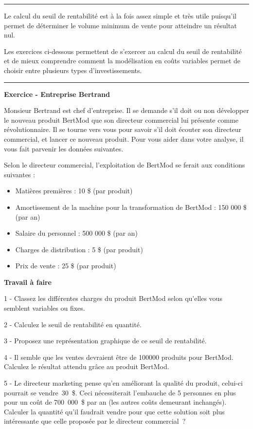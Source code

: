 \documentclass[oneside]{kaobook}
\begin{document}
\noindent\rule{\textwidth}{0.5pt}

Le calcul du seuil de rentabilité est à la fois assez simple et très utile puisqu'il permet de déterminer le volume minimum de vente pour atteindre un résultat nul.

Les exercices ci-dessous permettent de s'exercer au calcul du seuil de rentabilité et de mieux comprendre comment la modélisation en coûts variables permet de choisir entre plusieurs types d'investissements.

\noindent\rule{\textwidth}{0.5pt}
\textbf{Exercice - Entreprise Bertrand}

Monsieur Bertrand est chef d'entreprise. Il se demande s'il doit ou non développer le nouveau produit BertMod que son directeur commercial lui présente comme révolutionnaire. Il se tourne vers vous pour savoir s'il doit écouter son directeur commercial, et lancer ce nouveau produit. Pour vous aider dans votre analyse, il vous fait parvenir les données suivantes.

Selon le directeur commercial, l'exploitation de BertMod se ferait aux conditions suivantes :
\begin{itemize}
\item Matières premières : 10 \$ (par produit)
\item Amortissement de la machine pour la transformation de BertMod : 150 000 \$ (par an)
\item Salaire du personnel : 500 000 \$ (par an)
\item Charges de distribution : 5 \$ (par produit)
\item Prix de vente : 25 \$ (par produit)
\end{itemize}

\textbf{Travail à faire}

1 - Classez les différentes charges du produit BertMod selon qu'elles vous semblent variables ou fixes.

2 - Calculez le seuil de rentabilité en quantité.

3 - Proposez une représentation graphique de ce seuil de rentabilité.

4 - Il semble que les ventes devraient être de 100000 produits pour BertMod. Calculez le résultat attendu grâce au produit BertMod.

5 - Le directeur marketing pense qu'en améliorant la qualité du produit, celui-ci pourrait se vendre 30 \$. Ceci nécessiterait l'embauche de 5 personnes en plus pour un coût de 700 000 \$ par an (les autres coûts demeurant inchangés). Calculer la quantité qu'il faudrait vendre pour que cette solution soit plus intéressante que celle proposée par le directeur commercial ?
\end{document}
